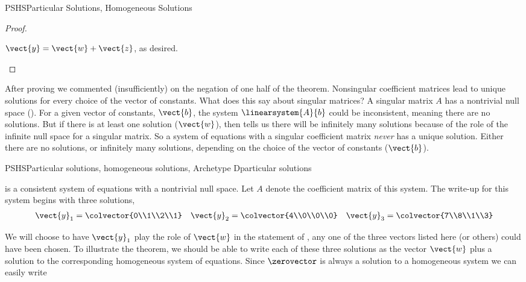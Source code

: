 \begin{subsect}{PSHS}{Particular Solutions, Homogeneous Solutions}
\begin{proof}
\begin{para}
$\vect{y}=\vect{w}+\vect{z}$, as desired.\end{para}
%
\end{proof}
%
\begin{para}After proving  we commented (insufficiently) on the negation of one half of the theorem.  Nonsingular coefficient matrices lead to unique solutions for every choice of the vector of constants.  What does this say about singular matrices?  A singular matrix $A$ has a nontrivial null space ().  For a given vector of constants, $\vect{b}$, the system $\linearsystem{A}{b}$ could be inconsistent, meaning there are no solutions.  But if there is at least one solution ($\vect{w}$), then  tells us there will be infinitely many solutions because of the role of the infinite null space for a singular matrix.  So a system of equations with a singular coefficient matrix {\em never} has a unique solution.  Either there are no solutions, or infinitely many solutions, depending on the choice of the vector of constants ($\vect{b}$).\end{para}
%
\begin{example}{PSHS}{Particular solutions, homogeneous solutions, Archetype D}{particular solutions}
\begin{para} is a consistent system of equations with a nontrivial null space.  Let $A$ denote the coefficient matrix of this system.  The write-up for this system begins with three solutions,
%
\begin{align*}
\vect{y}_1=\colvector{0\\1\\2\\1}&&
\vect{y}_2=\colvector{4\\0\\0\\0}&&
\vect{y}_3=\colvector{7\\8\\1\\3}
\end{align*}\end{para}
%
\begin{para}We will choose to have $\vect{y}_1$ play the role of $\vect{w}$ in the statement of , any one of the three vectors listed here (or others) could have been chosen.   To illustrate the theorem, we should be able to write each of these three solutions as the vector $\vect{w}$ plus a solution to the corresponding homogeneous system of equations.  Since $\zerovector$ is always a solution to a homogeneous system we can easily write

\end{para}
\end{example}
\end{subsect}
